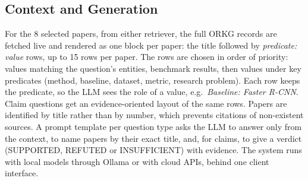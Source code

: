 \subsection{Context and Generation}

For the 8 selected papers, from either retriever, the full ORKG records are
fetched live and rendered as one block per paper: the title followed by
\emph{predicate: value} rows, up to 15 rows per paper. The rows are chosen in order of priority: values matching the question's
entities, benchmark results, then values under key predicates (method,
baseline, dataset, metric, research problem). Each row keeps the predicate,
so the LLM sees the role of a value, e.g.\ \emph{Baseline: Faster R-CNN}. Claim questions get an evidence-oriented layout of the same
rows. Papers are identified by title rather than by number, which prevents
citations of non-existent sources. A prompt template per question type asks
the LLM to answer only from the context, to name papers by their exact title,
and, for claims, to give a verdict (SUPPORTED, REFUTED or INSUFFICIENT) with
evidence. The system runs with local models through Ollama or with cloud APIs,
behind one client interface.
